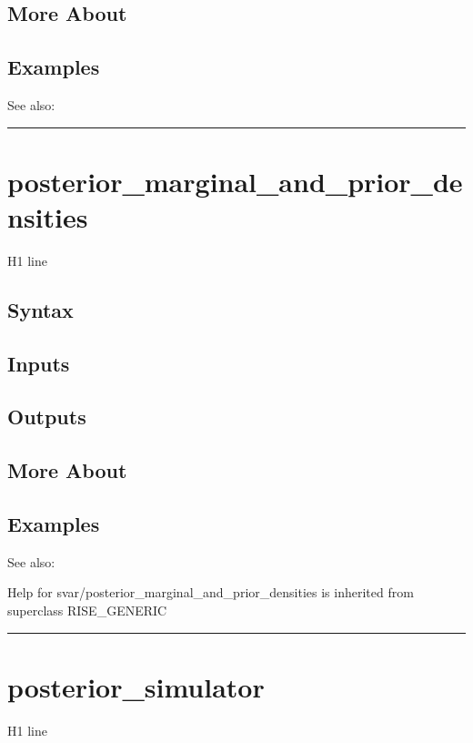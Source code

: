 \documentclass[letterpaper,10pt,english]{sphinxmanual}
\begin{document}
\subsection{More About}
\label{classes/models/@svar/svar:id71}

\subsection{Examples}
\label{classes/models/@svar/svar:id72}
See also:


\bigskip\hrule{}\bigskip



\section{posterior\_marginal\_and\_prior\_densities}
\label{classes/models/@svar/svar:id73}\label{classes/models/@svar/svar:posterior-marginal-and-prior-densities}
H1 line


\subsection{Syntax}
\label{classes/models/@svar/svar:id74}

\subsection{Inputs}
\label{classes/models/@svar/svar:id75}

\subsection{Outputs}
\label{classes/models/@svar/svar:id76}

\subsection{More About}
\label{classes/models/@svar/svar:id77}

\subsection{Examples}
\label{classes/models/@svar/svar:id78}
See also:

Help for svar/posterior\_marginal\_and\_prior\_densities is inherited from superclass RISE\_GENERIC


\bigskip\hrule{}\bigskip



\section{posterior\_simulator}
\label{classes/models/@svar/svar:posterior-simulator}\label{classes/models/@svar/svar:id79}
H1 line
\end{document}
